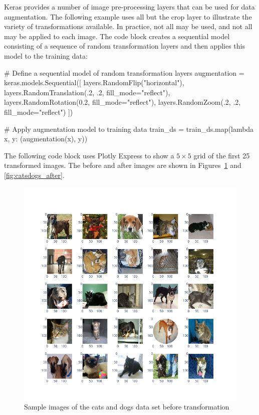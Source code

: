 Keras provides a number of image pre-processing layers that can be used for data augmentation. The following example uses all but the crop layer to illustrate the variety of transformations available. In practice, not all may be used, and not all may be applied to each image. The code block creates a sequential model consisting of a sequence of random transformation layers and then applies this model to the training data:

\begin{pythoncode}
# Define a sequential model of random transformation layers
augmentation = keras.models.Sequential([
    layers.RandomFlip("horizontal"),
    layers.RandomTranslation(.2, .2, fill_mode="reflect"),
    layers.RandomRotation(0.2, fill_mode="reflect"),
    layers.RandomZoom(.2, .2, fill_mode="reflect")
])

# Apply augmentation model to training data
train_ds = train_ds.map(lambda x, y: (augmentation(x), y))
\end{pythoncode}

The following code block uses Plotly Express to show a $5 \times 5$ grid of the first 25 transformed images. The before and after images are shown in Figures~\ref{fig:catsdogs_before} and \ref{fig:catsdogs_after}.

\begin{figure}
\begin{center}
\includegraphics[width=.8\textwidth]{catsdogs_sample.png}
\end{center}
\caption{Sample images of the cats and dogs data set before transformation}
\label{fig:catsdogs_before}
\end{figure}

